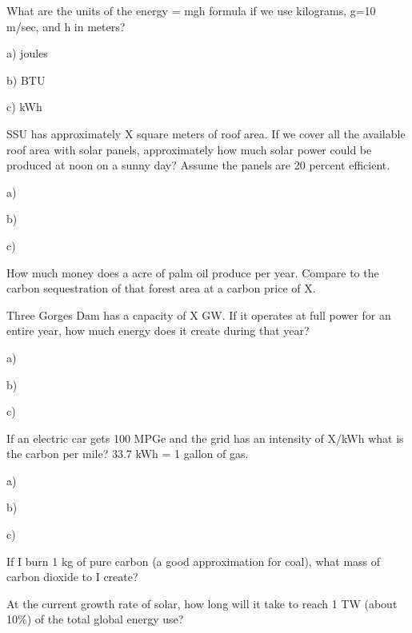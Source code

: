 \documentclass[12pt, oneside]{article}
\begin{document}
\problem{}
What are the units of the energy = mgh formula if we use kilograms, g=10
m/sec, and h in meters?

a) joules

b) BTU

c) kWh



SSU has approximately X square meters of roof area.  If we cover all the
available roof area with solar panels, approximately how much solar
power could be produced at noon on a sunny day?  Assume the panels are
20 percent efficient.

a)

b)

c)


\problem{}

How much money does a acre of palm oil produce per year.  Compare to the
carbon sequestration of that forest area at a carbon price of X.



\problem{}
Three Gorges Dam has a capacity of X GW.  If it operates at full power
for an entire year, how much energy does it create during that year?

a)

b)

c)




\problem{}
If an electric car gets 100 MPGe and the grid has an intensity of X/kWh
what is the carbon per mile?  33.7 kWh = 1 gallon of gas.


a)

b)

c)


\problem{}




\problem{}
If I burn 1 kg of pure carbon (a good approximation for coal), what mass
of carbon dioxide to I create?

\problem{}
At the current growth rate of solar, how long will it take to reach 1 TW
(about 10\%) of the total global energy use?
\end{document}
